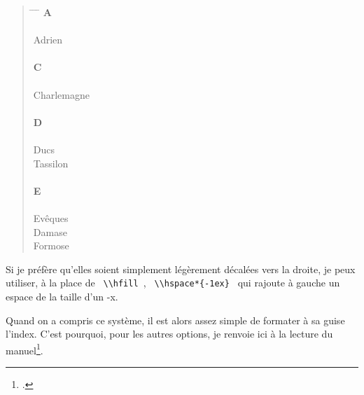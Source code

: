 \begin{quotation}
\begin{tabbing}
\hspace{0,5cm}  \= \hspace{1cm} \= \hspace{1,5cm} \= \kill
\>\> \large{\textbf{A}}\\
\\
Adrien\>\> \\
\\
\>\> \large{\textbf{C}}\\
\\
Charlemagne \>\> \\
\\
\>\> \large{\textbf{D}}\\
\\
Ducs \\
\> Tassilon\>\\
\\
\>\> \large{\textbf{E}}\\
\\
Evêques \\
\> Damase \>\\
\> Formose\>\\

\end{tabbing}
\end{quotation}


Si je préfère qu'elles soient simplement légèrement décalées vers la droite, je peux utiliser, à la place de \verb| \\hfill |, \verb| \\hspace*{-1ex} |  qui rajoute à gauche un espace de la taille d'un -x. 


Quand on a compris ce système, il est alors assez simple de formater à sa guise l'index. C'est pourquoi, pour les autres options, je renvoie ici à la lecture du manuel\footcite[On pourra aussi consulter][]{frama_index}. 




